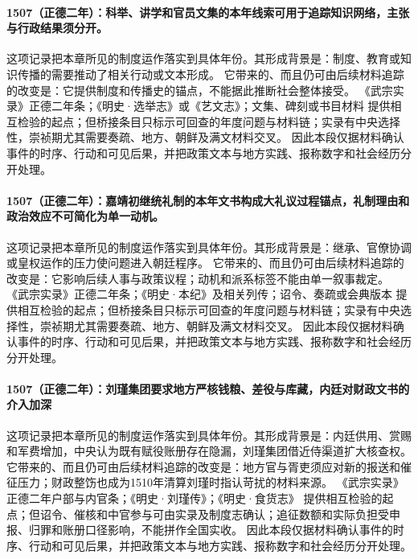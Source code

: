\paragraph{1507（正德二年）：科举、讲学和官员文集的本年线索可用于追踪知识网络，主张与行政结果须分开。} 这项记录把本章所见的制度运作落实到具体年份。其形成背景是：制度、教育或知识传播的需要推动了相关行动或文本形成。 它带来的、而且仍可由后续材料追踪的改变是：它提供制度和传播史的锚点，不能据此推断社会整体接受。 《武宗实录》正德二年条；《明史·选举志》或《艺文志》；文集、碑刻或书目材料 提供相互检验的起点；但桥接条目只标示可回查的年度问题与材料链；实录有中央选择性，崇祯期尤其需要奏疏、地方、朝鲜及满文材料交叉。 因此本段仅据材料确认事件的时序、行动和可见后果，并把政策文本与地方实践、报称数字和社会经历分开处理。

\paragraph{1507（正德二年）：嘉靖初继统礼制的本年文书构成大礼议过程锚点，礼制理由和政治效应不可简化为单一动机。} 这项记录把本章所见的制度运作落实到具体年份。其形成背景是：继承、官僚协调或皇权运作的压力使问题进入朝廷程序。 它带来的、而且仍可由后续材料追踪的改变是：它影响后续人事与政策议程；动机和派系标签不能由单一叙事裁定。 《武宗实录》正德二年条；《明史·本纪》及相关列传；诏令、奏疏或会典版本 提供相互检验的起点；但桥接条目只标示可回查的年度问题与材料链；实录有中央选择性，崇祯期尤其需要奏疏、地方、朝鲜及满文材料交叉。 因此本段仅据材料确认事件的时序、行动和可见后果，并把政策文本与地方实践、报称数字和社会经历分开处理。

\paragraph{1507（正德二年）：刘瑾集团要求地方严核钱粮、差役与库藏，内廷对财政文书的介入加深} 这项记录把本章所见的制度运作落实到具体年份。其形成背景是：内廷供用、赏赐和军费增加，中央认为既有赋役账册存在隐漏，刘瑾集团借近侍渠道扩大核查权。 它带来的、而且仍可由后续材料追踪的改变是：地方官与胥吏须应对新的报送和催征压力；财政整饬也成为1510年清算刘瑾时指认苛扰的材料来源。 《武宗实录》正德二年户部与内官条；《明史·刘瑾传》；《明史·食货志》 提供相互检验的起点；但诏令、催核和中官参与可由实录及制度志确认；追征数额和实际负担受申报、归罪和账册口径影响，不能拼作全国实收。 因此本段仅据材料确认事件的时序、行动和可见后果，并把政策文本与地方实践、报称数字和社会经历分开处理。

